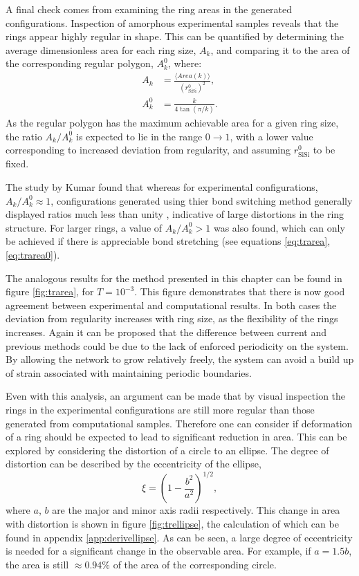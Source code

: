 A final check comes from examining the ring areas in the generated configurations.
Inspection of amorphous experimental samples reveals that the rings appear highly regular in shape. 
This can be quantified by determining the average dimensionless area for each ring size, $A_k$, and comparing it to the area of the corresponding regular polygon, $A_k^0$, where:
\begin{align}
	A_k &= \frac{\langle Area\left(k\right) \rangle}{\left(r_{\text{SiSi}}^{0}\right)^2}, \label{eq:trarea} \\[0.5em]
	A_k^0 &= \frac{k}{4\tan\left(\pi / k \right)} \label{eq:trarea0}.
\end{align}
As the regular polygon has the maximum achievable area for a given ring size, the ratio $A_k / A_k^0$ is expected to lie in the range $0\rightarrow 1$, with a lower value corresponding to increased deviation from regularity, and assuming $r_{\text{SiSi}}^{0}$ to be fixed.

The study by Kumar \etal{} found that whereas for experimental configurations, $A_k / A_k^0 \approx 1$, configurations generated using thier bond switching method generally displayed ratios much less than unity \cite{Kumar2012}, indicative of large distortions in the ring structure. 
For larger rings, a value of $A_k / A_k^0 > 1$ was also found, which can only be achieved if there is appreciable bond stretching (see equations \eqref{eq:trarea}, \eqref{eq:trarea0}). 

The analogous results for the method presented in this chapter can be found in figure \ref{fig:trarea}, for $T=10^{-3}$. 
This figure demonstrates that there is now good agreement between experimental and computational results. 
In both cases the deviation from regularity increases with ring size, as the flexibility of the rings increases. 
Again it can be proposed that the difference between current and previous methods could be due to the lack of enforced periodicity on the system. 
By allowing the network to grow relatively freely, the system can avoid a build up of strain associated with maintaining periodic boundaries.

Even with this analysis, an argument can be made that by visual inspection the rings in the experimental configurations are still more regular than those generated from computational samples. 
Therefore one can consider if deformation of a ring should be expected to lead to significant reduction in area. 
This can be explored by considering the distortion of a circle to an ellipse. 
The degree of distortion can be described by the eccentricity of the ellipse,
\begin{equation}
	\xi = \left(1-\frac{b^2}{a^2}\right)^{1/2},
\end{equation}
where $a$, $b$ are the major and minor axis radii respectively. 
This change in area with distortion is shown in figure \ref{fig:trellipse}, the calculation of which can be found in appendix \ref{app:derivellipse}. 
As can be seen, a large degree of eccentricity is needed for a significant change in the observable area. 
For example, if $a=1.5 b$, the area is still $\approx0.94\%$ of the area of the corresponding circle. 

